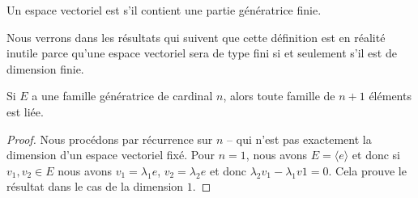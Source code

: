 \begin{definition}
    Un espace vectoriel est  s'il contient une partie génératrice finie. 
\end{definition}
Nous verrons dans les résultats qui suivent que cette définition est en réalité inutile parce qu'une espace vectoriel sera de type fini si et seulement s'il est de dimension finie.

\begin{lemma}       \label{LemytHnlD}
    Si \( E\) a une famille génératrice de cardinal \( n\), alors toute famille de \( n+1\) éléments est liée.
\end{lemma}

\begin{proof}
    Nous procédons par récurrence sur \( n\) -- qui n'est pas exactement la dimension d'un espace vectoriel fixé. Pour \( n=1\), nous avons \( E=\langle e\rangle\) et donc si \( v_1,v_2\in E\) nous avons \( v_1=\lambda_1 e\), \( v_2=\lambda_2e\) et donc \( \lambda_2v_1-\lambda_1v1=0\). Cela prouve le résultat dans le cas de la dimension \( 1\).


\end{proof}
